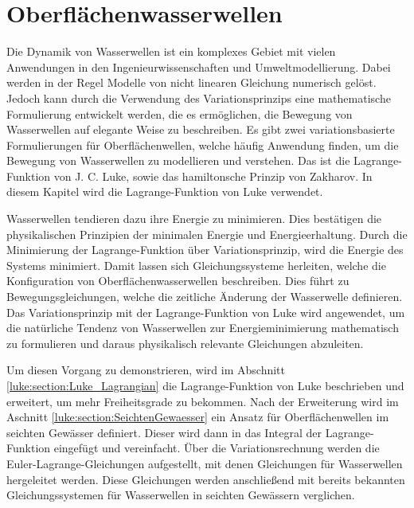 %
%
%
%
\chapter{Oberflächenwasserwellen\label{chapter:luke}}
\begin{refsection}

Die Dynamik von Wasserwellen ist ein komplexes Gebiet mit vielen Anwendungen in den Ingenieurwissenschaften und Umweltmodellierung.
Dabei werden in der Regel Modelle von nicht linearen Gleichung numerisch gelöst.
Jedoch kann durch die Verwendung des Variationsprinzips eine mathematische Formulierung entwickelt werden, die es ermöglichen, die Bewegung von Wasserwellen auf elegante Weise zu beschreiben.
Es gibt zwei variationsbasierte Formulierungen für Oberflächenwellen, welche häufig Anwendung finden, um die Bewegung von Wasserwellen zu modellieren und verstehen.
Das ist die Lagrange-Funktion von J. C. Luke, sowie das hamiltonsche Prinzip von Zakharov.
In diesem Kapitel wird die Lagrange-Funktion von Luke verwendet.

Wasserwellen tendieren dazu ihre Energie zu minimieren.
Dies bestätigen die physikalischen Prinzipien der minimalen Energie und Energieerhaltung.
Durch die Minimierung der Lagrange-Funktion über Variationsprinzip, wird die Energie des Systems minimiert. Damit lassen sich Gleichungssysteme herleiten, welche die Konfiguration von Oberflächenwasserwellen beschreiben.
Dies führt zu Bewegungsgleichungen, welche die zeitliche Änderung der Wasserwelle definieren.
Das Variationsprinzip mit der Lagrange-Funktion von Luke wird angewendet, um die natürliche Tendenz von Wasserwellen zur Energieminimierung mathematisch zu formulieren und daraus physikalisch relevante Gleichungen abzuleiten.

Um diesen Vorgang zu demonstrieren, wird im Abschnitt \ref{luke:section:Luke_Lagrangian} die Lagrange-Funktion von Luke beschrieben und erweitert, um mehr Freiheitsgrade zu bekommen.
Nach der Erweiterung wird im Aschnitt \ref{luke:section:SeichtenGewaesser} ein Ansatz für Oberflächenwellen im seichten Gewässer definiert.
Dieser wird dann in das Integral der Lagrange-Funktion eingefügt und vereinfacht.
Über die Variationsrechnung werden die Euler-Lagrange-Gleichungen aufgestellt, mit denen Gleichungen für Wasserwellen hergeleitet werden.
Diese Gleichungen werden anschließend mit bereits bekannten Gleichungssystemen für Wasserwellen in seichten Gewässern verglichen.




\printbibliography[heading=subbibliography]
\end{refsection}
